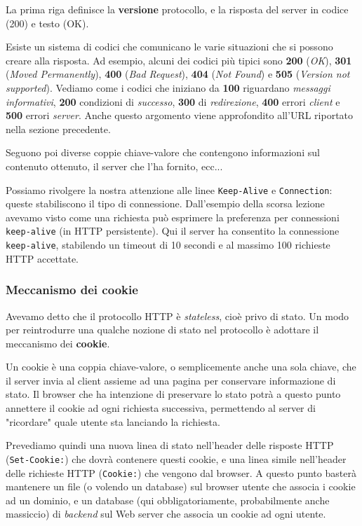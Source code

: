 \documentclass[a4paper,11pt]{article}
\begin{document}
La prima riga definisce la \textbf{versione} protocollo, e la risposta del server in codice (200) e testo (OK).

Esiste un sistema di codici che comunicano le varie situazioni che si possono creare alla risposta.
Ad esempio, alcuni dei codici più tipici sono \textbf{200} (\textit{OK}), \textbf{301} (\textit{Moved Permanently}), \textbf{400} (\textit{Bad Request}), \textbf{404} (\textit{Not Found}) e \textbf{505} (\textit{Version not supported}).
Vediamo come i codici che iniziano da \textbf{100} riguardano \textit{messaggi informativi}, \textbf{200} condizioni di \textit{successo}, \textbf{300} di \textit{redirezione}, \textbf{400} errori \textit{client} e \textbf{500} errori \textit{server}.
Anche questo argomento viene approfondito all'URL riportato nella sezione precedente.

Seguono poi diverse coppie chiave-valore che contengono informazioni sul contenuto ottenuto, il server che l'ha fornito, ecc...

Possiamo rivolgere la nostra attenzione alle linee \lstinline|Keep-Alive| e \lstinline|Connection|: queste stabiliscono il tipo di connessione. Dall'esempio della scorsa lezione avevamo visto come una richiesta può esprimere la preferenza per connessioni \lstinline|keep-alive| (in HTTP persistente).
Qui il server ha consentito la connessione \lstinline|keep-alive|, stabilendo un timeout di 10 secondi e al massimo 100 richieste HTTP accettate.

\subsubsection{Meccanismo dei cookie}
Avevamo detto che il protocollo HTTP è \textit{stateless}, cioè privo di stato. Un modo per reintrodurre una qualche nozione di stato nel protocollo è adottare il meccanismo dei \textbf{cookie}.

Un cookie è una coppia chiave-valore, o semplicemente anche una sola chiave, che il server invia al client assieme ad una pagina per conservare informazione di stato.
Il browser che ha intenzione di preservare lo stato potrà a questo punto annettere il cookie ad ogni richiesta successiva, permettendo al server di "ricordare" quale utente sta lanciando la richiesta.

Prevediamo quindi una nuova linea di stato nell'header delle risposte HTTP (\lstinline|Set-Cookie:|) che dovrà contenere questi cookie, e una linea simile nell'header delle richieste HTTP (\lstinline|Cookie:|) che vengono dal browser.
A questo punto basterà mantenere un file (o volendo un database) sul browser utente che associa i cookie ad un dominio, e un database (qui obbligatoriamente, probabilmente anche massiccio) di \textit{backend} sul Web server che associa un cookie ad ogni utente.
\end{document}

